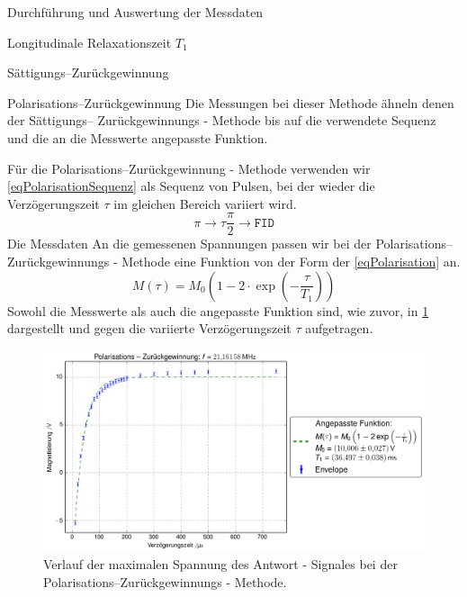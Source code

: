 \documentclass[pdftex, a4paper,11pt, twoside, ngerman]{report}
\begin{document}
\begin{chapter}{Durchführung und Auswertung der Messdaten}
\begin{section}{
        Longitudinale Relaxationszeit $T_{1}$}
\begin{subsection}{Sättigungs--Zurückgewinnung}
      \end{subsection}
      
      
      
      \begin{subsection}{Polarisations--Zurückgewinnung}
        \label{chpLongRelaxPolarisation}
        Die Messungen bei dieser Methode ähneln denen der Sättigungs--
        Zurückgewinnungs - Methode bis auf die verwendete Sequenz und die an die
        Messwerte angepasste Funktion.
        
        Für die Polarisations--Zurückgewinnung - Methode verwenden wir
        \cref{eqPolarisationSequenz} als Sequenz von Pulsen, bei der wieder die
        Verzögerungszeit $\tau$ im gleichen Bereich variiert wird.
        \begin{equation}
          \label{eqPolarisationSequenz}
          \pi \rightarrow \tau \frac{\pi}{2} \rightarrow \mathtt{FID}
        \end{equation}
        Die Messdaten 
        An die gemessenen Spannungen passen wir bei der Polarisations--
        Zurückgewinnungs - Methode eine Funktion von der Form der
        \cref{eqPolarisation} an.
        \begin{equation}
          \label{eqPolarisation}
          M(\tau)=M_{0}\left(1-2\cdot\exp\left(-\frac{\tau}{T_{1}}\right)\right)
        \end{equation} 
        Sowohl die Messwerte als auch die angepasste Funktion sind, wie zuvor,
        in \cref{figPolarisation} dargestellt und gegen die variierte
        Verzögerungszeit $\tau$ aufgetragen.
        \begin{figure}[htb]
          \centering
          \includegraphics[width=\textwidth]
          {Figures/PolarisationsZurueckgewinnung.png}
          \caption{Verlauf der maximalen Spannung des Antwort - Signales bei der
            Polarisations--Zurückgewinnungs - Methode.}
          \label{figPolarisation}
        \end{figure}
        

\end{subsection}
\end{section}
\end{chapter}
\end{document}
